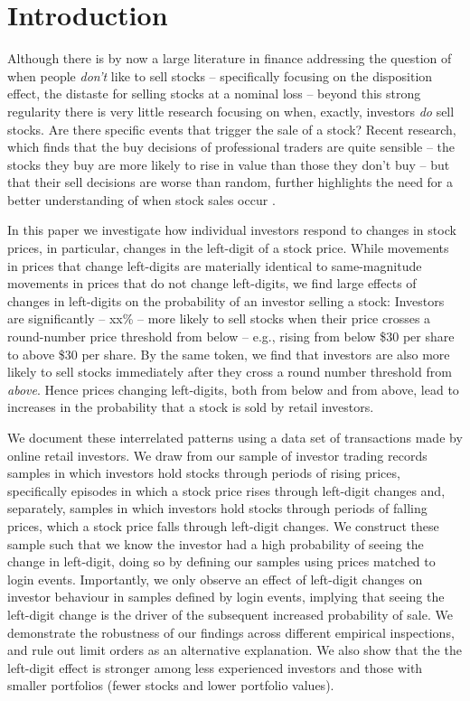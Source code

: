 \section{Introduction} \label{sec:introduction}

Although there is by now a large literature in finance addressing the question of when people \textit{don't} like to sell stocks -- specifically focusing on the disposition effect, the distaste for selling stocks at a nominal loss -- beyond this strong regularity there is very little research focusing on when, exactly, investors \textit{do} sell stocks. Are there specific events that trigger the sale of a stock? 
Recent research, which finds that the buy decisions of professional traders are quite sensible -- the stocks they buy are more likely to rise in value than those they don't buy -- but that their sell decisions are worse than random, further highlights the need for a better understanding of when stock sales occur \citep{akepanidtaworn2019selling}. 

In this paper we investigate how individual investors respond to changes in stock prices, in particular, changes in the left-digit of a stock price. While movements in prices that change left-digits are materially identical to same-magnitude movements in prices that do not change left-digits, we find large effects of changes in left-digits on the probability of an investor selling a stock:  Investors are significantly -- xx\% -- more likely to sell stocks when their price crosses a round-number price threshold from below -- e.g., rising from below \$30 per share to above \$30 per share. By the same token, we find that investors are also more likely to sell stocks immediately after they cross a round number threshold from \textit{above}. Hence prices changing left-digits, both from below and from above, lead to increases in the probability that a stock is sold by retail investors.  

We document these interrelated patterns using a data set of transactions made by online retail investors. We draw from our sample of investor trading records samples in which investors hold stocks through periods of rising prices, specifically episodes in which a stock price rises through left-digit changes and, separately, samples in which investors hold stocks through periods of falling prices, which a stock price falls through left-digit changes. We construct these sample such that we know the investor had a high probability of seeing the change in left-digit, doing so by defining our samples using prices matched to login events. Importantly, we only observe an effect of left-digit changes on investor behaviour in samples defined by login events, implying that seeing the left-digit change is the driver of the subsequent increased probability of sale. We demonstrate the robustness of our findings across different empirical inspections, and rule out limit orders as an alternative explanation. We also show that the the left-digit effect is stronger among less experienced investors and those with smaller portfolios (fewer stocks and lower portfolio values).  


